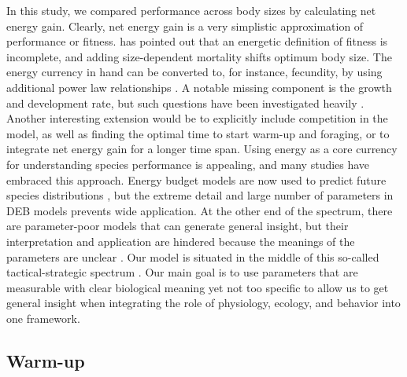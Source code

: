 In this study, we compared performance across body sizes by calculating net energy gain.
Clearly, net energy gain is a very simplistic approximation of performance or fitness.
\citet{Kozlowski1996} has pointed out that an energetic definition of fitness is incomplete, and adding size-dependent mortality shifts optimum body size.
The energy currency in hand can be converted to, for instance, fecundity, by using additional power law relationships \citep{Kooijman2009}.
A notable missing component is the growth and development rate, but such questions have been investigated heavily \citep{VandH1996, Kozlowski2004,Kooijman2009}.
Another interesting extension would be to explicitly include competition in the model, as well as finding the optimal time to start warm-up and foraging, or to integrate net energy gain for a longer time span.
Using energy as a core currency for understanding species performance is appealing, and many studies have embraced this approach.
Energy budget models are now used to predict future species distributions \citep[e.g.,][]{Buckley2008}, but the extreme detail and large number of parameters in DEB models \citep{Kooijman2009} prevents wide application.
At the other end of the spectrum, there are parameter-poor models that can generate general insight, but their interpretation and application are hindered because the meanings of the parameters are unclear \citep[e.g.,][]{Brown1993}.
Our model is situated in the middle of this so-called tactical-strategic spectrum \citep{Holling1966}.
Our main goal is to use parameters that are measurable with clear biological meaning yet not too specific to allow us to get general insight when integrating the role of physiology, ecology, and behavior into one framework.

\subsection*{Warm-up}

